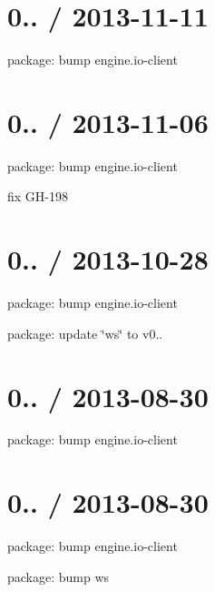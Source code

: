 \section*{0.. / 2013-\/11-\/11 }


\begin{DoxyItemize}
\item package\+: bump {\ttfamily engine.\+io-\/client}
\end{DoxyItemize}

\section*{0.. / 2013-\/11-\/06 }


\begin{DoxyItemize}
\item package\+: bump engine.\+io-\/client
\item fix G\+H-\/198
\end{DoxyItemize}

\section*{0.. / 2013-\/10-\/28 }


\begin{DoxyItemize}
\item package\+: bump {\ttfamily engine.\+io-\/client}
\item package\+: update \char`\"{}ws\char`\"{} to v0..
\end{DoxyItemize}

\section*{0.. / 2013-\/08-\/30 }


\begin{DoxyItemize}
\item package\+: bump {\ttfamily engine.\+io-\/client}
\end{DoxyItemize}

\section*{0.. / 2013-\/08-\/30 }


\begin{DoxyItemize}
\item package\+: bump {\ttfamily engine.\+io-\/client}
\item package\+: bump ws
\end{DoxyItemize}


